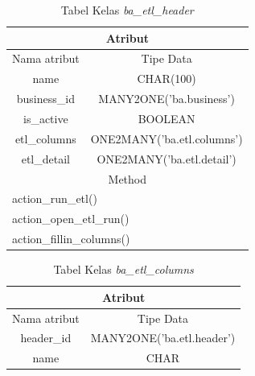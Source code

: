 \begin{table}[H]
	\centering
		\caption{Tabel Kelas \textit{ba\_etl\_header}}
		\begin{tabular}{ | c | c|}
			\hline
				\multicolumn{2}{|c|}{Atribut}\\ \hline 
				Nama atribut & Tipe Data\\ \hline
			name & CHAR(100)\\ \hline
			business\_id & MANY2ONE('ba.business')\\ \hline
			is\_active & BOOLEAN\\ \hline
			etl\_columns & ONE2MANY('ba.etl.columns')\\ \hline
			etl\_detail & ONE2MANY('ba.etl.detail')\\ \hline
			\multicolumn{2}{|c|}{Method}\\ \hline 
			\multicolumn{2}{|l|}{action\_run\_etl()}\\ \hline 
			\multicolumn{2}{|l|}{action\_open\_etl\_run()}\\ \hline
			\multicolumn{2}{|l|}{action\_fillin\_columns()}\\ \hline
		\end{tabular}
\end{table}

\begin{table}[H]
	\centering
		\caption{Tabel Kelas \textit{ba\_etl\_columns}}
		\begin{tabular}{ | c | c|}
			\hline
				\multicolumn{2}{|c|}{Atribut}\\ \hline 
				Nama atribut & Tipe Data\\ \hline
			header\_id & MANY2ONE('ba.etl.header')\\ \hline
			name & CHAR\\ \hline
		\end{tabular}
\end{table}

